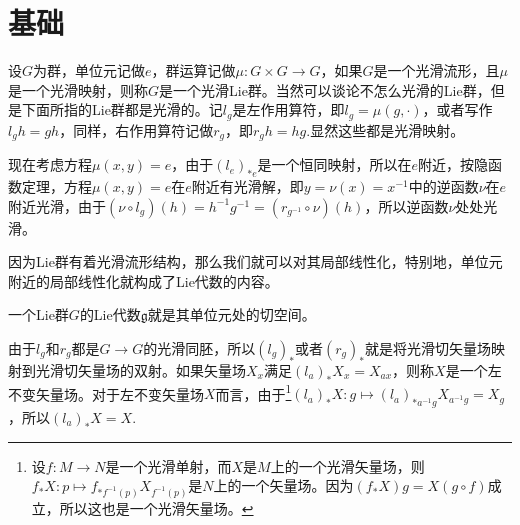 \documentclass[9pt]{extarticle}
\newcommand{\lag}{{\mathfrak{g}}}
\begin{document}





\section{基础}

\para 设$G$为群，单位元记做$e$，群运算记做$\mu:G\times G\to G$，如果$G$是一个光滑流形，且$\mu$是一个光滑映射，则称$G$是一个光滑Lie群。当然可以谈论不怎么光滑的Lie群，但是下面所指的Lie群都是光滑的。记$l_g$是左作用算符，即$l_g=\mu(g,\cdot)$，或者写作$l_gh=gh$，同样，右作用算符记做$r_g$，即$r_gh=hg$.显然这些都是光滑映射。

现在考虑方程$\mu(x,y)=e$，由于$(l_e)_{*e}$是一个恒同映射，所以在$e$附近，按隐函数定理，方程$\mu(x,y)=e$在$e$附近有光滑解，即$y=\nu(x)=x^{-1}$中的逆函数$\nu$在$e$附近光滑，由于$(\nu\circ l_g)(h)=h^{-1}g^{-1}=(r_{g^{-1}}\circ \nu)(h)$，所以逆函数$\nu$处处光滑。

因为Lie群有着光滑流形结构，那么我们就可以对其局部线性化，特别地，单位元附近的局部线性化就构成了Lie代数的内容。

\para 一个Lie群$G$的Lie代数$\lag$就是其单位元处的切空间。

由于$l_g$和$r_g$都是$G\to G$的光滑同胚，所以$(l_g)_*$或者$(r_g)_*$就是将光滑切矢量场映射到光滑切矢量场的双射。如果矢量场$X_x$满足$(l_a)_*X_x=X_{ax}$，则称$X$是一个左不变矢量场。对于左不变矢量场$X$而言，由于\footnote{设$f:M\to N$是一个光滑单射，而$X$是$M$上的一个光滑矢量场，则$f_*X:p\mapsto f_{*f^{-1}(p)}X_{f^{-1}(p)}$是$N$上的一个矢量场。因为$(f_*X)g=X(g\circ f)$成立，所以这也是一个光滑矢量场。}$(l_a)_*X:g\mapsto (l_a)_{*a^{-1}g}X_{a^{-1}g}=X_g$，所以$(l_a)_*X=X$.
\end{document}
